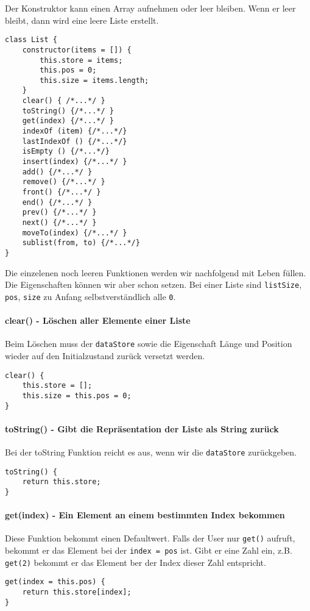 \documentclass{book}
\begin{document}
Der Konstruktor kann einen Array aufnehmen oder leer bleiben. Wenn er leer bleibt, dann wird eine leere Liste erstellt.

\begin{lstlisting}[caption=Array Konstruktor]
class List {
	constructor(items = []) {
		this.store = items;
		this.pos = 0;
		this.size = items.length;
	}
	clear() { /*...*/ }
	toString() {/*...*/ }
	get(index) {/*...*/ }
	indexOf (item) {/*...*/}
	lastIndexOf () {/*...*/}
	isEmpty () {/*...*/}
	insert(index) {/*...*/ }
	add() {/*...*/ }
	remove() {/*...*/ }
	front() {/*...*/ }
	end() {/*...*/ }
	prev() {/*...*/ }
	next() {/*...*/ }
	moveTo(index) {/*...*/ }
	sublist(from, to) {/*...*/}
}
\end{lstlisting}

Die einzelenen noch leeren Funktionen werden wir nachfolgend mit Leben füllen. Die Eigenschaften können wir aber schon setzen. Bei einer Liste sind \lstinline|listSize|, \lstinline|pos|, \lstinline|size| zu Anfang selbstverständlich alle \lstinline|0|.

\paragraph{clear() - Löschen aller Elemente einer Liste}
Beim Löschen muss der \lstinline|dataStore| sowie die Eigenschaft Länge und Position wieder auf den Initialzustand zurück versetzt werden.

\begin{lstlisting}[caption=Array Konstruktor]
clear() {
	this.store = [];
	this.size = this.pos = 0;	
}
\end{lstlisting}

\paragraph{toString() - Gibt die Repräsentation der Liste als String zurück} Bei der toString Funktion reicht es aus, wenn wir die \lstinline|dataStore| zurückgeben.

\begin{lstlisting}[caption=Array Konstruktor]
toString() {
	return this.store;
}
\end{lstlisting}

\paragraph{get(index) - Ein Element an einem bestimmten Index bekommen}
Diese Funktion bekommt einen Defaultwert. Falls der User nur \lstinline|get()| aufruft, bekommt er das Element bei der \lstinline|index = pos| ist. Gibt er eine Zahl ein, z.B. \lstinline|get(2)| bekommt er das Element ber der Index dieser Zahl entspricht.
\begin{lstlisting}[caption=Array Konstruktor]
get(index = this.pos) {
	return this.store[index];
}
\end{lstlisting}
\end{document}
